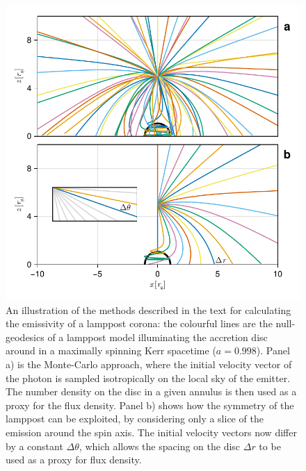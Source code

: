 \documentclass[fleqn,usenatbib]{mnras}
\begin{document}
\begin{figure}
    \centering
    \includegraphics[width=0.95\linewidth]{figures/emissivity.coronal-traces.pdf}
    \caption{An illustration of the methods described in the text for
        calculating the emissivity of a lamppost corona: the colourful lines are
        the null-geodesics of a lamppost model illuminating the accretion disc
        around in a maximally spinning Kerr spacetime ($a = 0.998$). Panel a) is
        the Monte-Carlo approach, where the initial velocity vector of the
        photon is sampled isotropically on the local sky of the emitter. The
        number density on the disc in a given annulus is then used as a proxy
        for the flux density. Panel b) shows how the symmetry of the lamppost can
        be exploited, by considering only a slice of the emission around the
        spin axis. The initial velocity vectors now differ by a constant $\Delta
    \theta$, which allows the spacing on the disc $\Delta r$ to be used as a
proxy for flux density.}
    \label{fig:coronal-tracing}
\end{figure}

\end{document}
